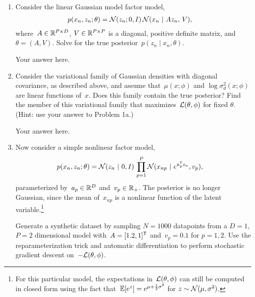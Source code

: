 \documentclass[11pt]{article}
\begin{document}
\begin{enumerate}[label=(\alph*)]
    \item Consider the linear Gaussian model factor model,
    \begin{align*}
        p(x_n, z_n; \theta) &= \mathcal{N}(z_n; 0, I) \, \mathcal{N}(x_n ~\vert~ A z_n, \, V),
    \end{align*}
    where~$A \in \mathbb{R}^{P \times D}$, $V \in \mathbb{R}^{P \times P}$ is a diagonal, positive definite matrix, and~$\theta = (A, V)$.  Solve for the true posterior~$p(z_n \mid x_n, \theta)$.
    
    \begin{solution}
    Your answer here.
    \end{solution}
    
    \item  Consider the variational family of Gaussian densities with diagonal covariance, as described above, and assume that~$\mu(x; \phi)$ and $\log \sigma_d^2(x; \phi)$ are linear functions of~$x$.  Does this family contain the true posterior?  Find the member of this variational family that maximizes~$\mathcal{L}(\theta, \phi)$ for fixed $\theta$. (Hint: use your answer to Problem 1a.)
    
    \begin{solution}
    Your answer here. 
    \end{solution}
    
    \item Now consider a simple nonlinear factor model,
    \begin{align*}
        p(x_n, z_n; \theta) &= \mathcal{N}(z_n ~\vert~ 0, I) \, \prod_{p=1}^P \mathcal{N}(x_{np} ~\vert~ e^{a_p^{\mathsf{T}} z_n}, v_p),
    \end{align*}
    parameterized by~$a_p \in \mathbb{R}^D$ and~$v_p \in \mathbb{R}_+$.  The posterior is no longer Gaussian, since the mean of~$x_{np}$ is a nonlinear function of the latent variable.\footnote{For this particular model, the expectations in~$\mathcal{L}(\theta, \phi)$ can still be computed in closed form using the fact that~$\mathbb{E}[e^z] = e^{\mu + \frac{1}{2}\sigma^2}$ for $z \sim \mathcal{N}(\mu, \sigma^2)$.}  
    
    Generate a synthetic dataset by sampling $N=1000$ datapoints from a $D=1$, $P=2$ dimensional model with~$A = [1.2, 1]^{\mathsf{T}}$ and~$v_p = 0.1$ for $p=1,2$.  Use the reparameterization trick and automatic differentiation to perform stochastic gradient descent on~$-\mathcal{L}(\theta, \phi)$.
    

\end{enumerate}
\end{document}
